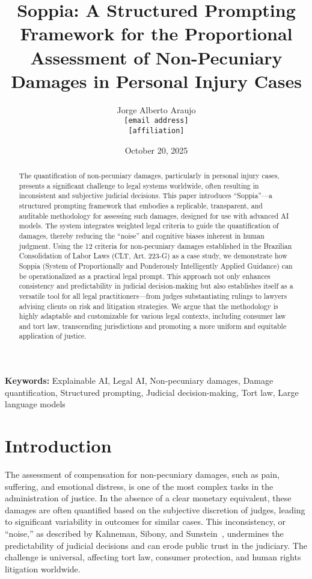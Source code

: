 \documentclass[11pt,a4paper]{article}
\title{Soppia: A Structured Prompting Framework for the Proportional Assessment of Non-Pecuniary Damages in Personal Injury Cases}
\author{
    Jorge Alberto Araujo\\
    \texttt{[email address]}\\
    \texttt{[affiliation]}
}
\date{October 20, 2025}
\begin{document}
\maketitle

\begin{abstract}
The quantification of non-pecuniary damages, particularly in personal injury cases, presents a significant challenge to legal systems worldwide, often resulting in inconsistent and subjective judicial decisions. This paper introduces ``Soppia''---a structured prompting framework that embodies a replicable, transparent, and auditable methodology for assessing such damages, designed for use with advanced AI models. The system integrates weighted legal criteria to guide the quantification of damages, thereby reducing the ``noise'' and cognitive biases inherent in human judgment. Using the 12 criteria for non-pecuniary damages established in the Brazilian Consolidation of Labor Laws (CLT, Art. 223-G) as a case study, we demonstrate how Soppia (System of Proportionally and Ponderously Intelligently Applied Guidance) can be operationalized as a practical legal prompt. This approach not only enhances consistency and predictability in judicial decision-making but also establishes itself as a versatile tool for all legal practitioners---from judges substantiating rulings to lawyers advising clients on risk and litigation strategies. We argue that the methodology is highly adaptable and customizable for various legal contexts, including consumer law and tort law, transcending jurisdictions and promoting a more uniform and equitable application of justice.
\end{abstract}

\noindent\textbf{Keywords:} Explainable AI, Legal AI, Non-pecuniary damages, Damage quantification, Structured prompting, Judicial decision-making, Tort law, Large language models

\section{Introduction}

The assessment of compensation for non-pecuniary damages, such as pain, suffering, and emotional distress, is one of the most complex tasks in the administration of justice. In the absence of a clear monetary equivalent, these damages are often quantified based on the subjective discretion of judges, leading to significant variability in outcomes for similar cases. This inconsistency, or ``noise,'' as described by Kahneman, Sibony, and Sunstein~\cite{kahneman2021noise}, undermines the predictability of judicial decisions and can erode public trust in the judiciary. The challenge is universal, affecting tort law, consumer protection, and human rights litigation worldwide.
\end{document}
